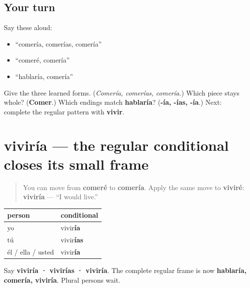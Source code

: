 \subsection*{Your turn}
Say these aloud:

\begin{itemize}
\raggedright
  \item “comería, comerías, comería”
  \item “comeré, comería”
  \item “hablaría, comería”
\end{itemize}

\begin{tcolorbox}[breakable,colback=teal!4,colframe=teal!35!black,title={Before you move on}]
Give the three learned forms. (\emph{Comería, comerías, comería.}) Which piece stays whole? (\textbf{Comer}.) Which endings match \textbf{hablaría}? (\textbf{-ía, -ías, -ía}.) Next: complete the regular pattern with \textbf{vivir}.
\end{tcolorbox}
\section[viviría]{viviría — the regular conditional closes its small frame}

\label{lesson:ES-C17-vivir-condicional}



\begin{quote}
You can move from \textbf{comeré} to \textbf{comería}. Apply the same move to \textbf{viviré}: \textbf{viviría} — “I would live.”
\end{quote}

\begin{grammarlens}[title={Grammar Lens: the singular -ir row}]
\noindent
\begin{tabularx}{\linewidth}{@{}>{\raggedright\arraybackslash}X>{\raggedright\arraybackslash}X@{}}
\toprule
\textbf{person} & \textbf{conditional} \\
\midrule
yo & vivir\textbf{ía} \\
tú & vivir\textbf{ías} \\
él / ella / usted & vivir\textbf{ía} \\
\bottomrule
\end{tabularx}

Say \textbf{viviría · vivirías · viviría}. The complete regular frame is now \textbf{hablaría, comería, viviría}. Plural persons wait.
\end{grammarlens}

